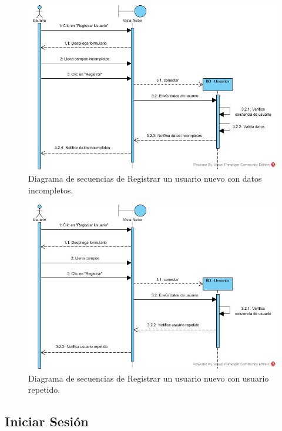 \begin{figure}[htbp!]
		\centering
			\includegraphics[width=1\textwidth]{images/Registrar_trayectoria_b}
		\caption{Diagrama de secuencias de Registrar un usuario nuevo con datos incompletos.}
\end{figure}

\begin{figure}[htbp!]
		\centering
			\includegraphics[width=1\textwidth]{images/Registrar_trayectoria_c}
		\caption{Diagrama de secuencias de Registrar un usuario nuevo con usuario repetido.}
\end{figure} 
\newpage

\subsection{Iniciar Sesión}

